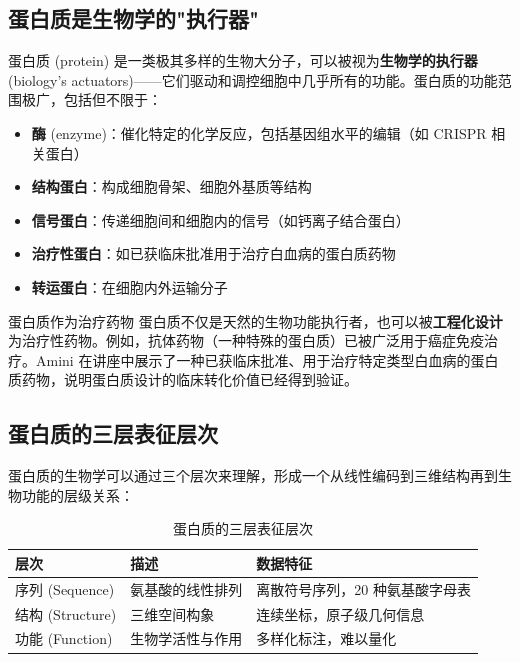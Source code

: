 \documentclass[a4paper]{article}
\begin{document}
\subsection{蛋白质是生物学的"执行器"}

蛋白质 (protein) 是一类极其多样的生物大分子，可以被视为\textbf{生物学的执行器} (biology's actuators)——它们驱动和调控细胞中几乎所有的功能。蛋白质的功能范围极广，包括但不限于：

\begin{itemize}
    \item \textbf{酶} (enzyme)：催化特定的化学反应，包括基因组水平的编辑（如 CRISPR 相关蛋白）
    \item \textbf{结构蛋白}：构成细胞骨架、细胞外基质等结构
    \item \textbf{信号蛋白}：传递细胞间和细胞内的信号（如钙离子结合蛋白）
    \item \textbf{治疗性蛋白}：如已获临床批准用于治疗白血病的蛋白质药物
    \item \textbf{转运蛋白}：在细胞内外运输分子
\end{itemize}

\begin{knowledgebox}{蛋白质作为治疗药物}
蛋白质不仅是天然的生物功能执行者，也可以被\textbf{工程化设计}为治疗性药物。例如，抗体药物（一种特殊的蛋白质）已被广泛用于癌症免疫治疗。Amini 在讲座中展示了一种已获临床批准、用于治疗特定类型白血病的蛋白质药物，说明蛋白质设计的临床转化价值已经得到验证。
\end{knowledgebox}

\subsection{蛋白质的三层表征层次}

蛋白质的生物学可以通过三个层次来理解，形成一个从线性编码到三维结构再到生物功能的层级关系：

\begin{table}[H]
\centering
\caption{蛋白质的三层表征层次}
\begin{tabular}{@{}lll@{}}
\toprule
\textbf{层次} & \textbf{描述} & \textbf{数据特征} \\
\midrule
序列 (Sequence) & 氨基酸的线性排列 & 离散符号序列，20 种氨基酸字母表 \\
结构 (Structure) & 三维空间构象 & 连续坐标，原子级几何信息 \\
功能 (Function) & 生物学活性与作用 & 多样化标注，难以量化 \\
\bottomrule
\end{tabular}
\end{table}
\end{document}
